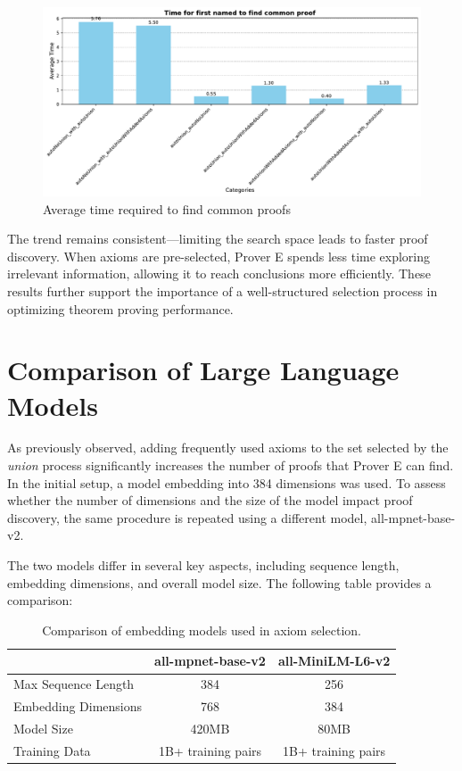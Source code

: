 \documentclass[english,version-2020-11]{uzl-thesis}
\begin{document}
\begin{figure}[h!]
    \centering
    \includegraphics[width=\textwidth]{time_to_find_common_proof.pdf}
    \caption{Average time required to find common proofs}
    \label{fig:time_different_mode}
\end{figure}        
\FloatBarrier

The trend remains consistent—limiting the search space leads to faster proof discovery. When axioms are pre-selected, Prover E spends less time exploring irrelevant information, allowing it to reach conclusions more efficiently. These results further support the importance of a well-structured selection process in optimizing theorem proving performance.


\section{Comparison of Large Language Models}

As previously observed, adding frequently used axioms to the set selected by the \textit{union} process significantly increases the number of proofs that Prover E can find. In the initial setup, a model embedding into 384 dimensions was used. To assess whether the number of dimensions and the size of the model impact proof discovery, the same procedure is repeated using a different model, all-mpnet-base-v2.

The two models differ in several key aspects, including sequence length, embedding dimensions, and overall model size. The following table provides a comparison:

\begin{table}[h]
    \centering
    \begin{tabular}{lcc}
        \hline
        & \textbf{all-mpnet-base-v2} & \textbf{all-MiniLM-L6-v2} \\
        \hline
        Max Sequence Length & 384 & 256 \\
        Embedding Dimensions & 768 & 384 \\
        Model Size & 420MB & 80MB \\
        Training Data & 1B+ training pairs & 1B+ training pairs \\
        \hline
    \end{tabular}
    \caption{Comparison of embedding models used in axiom selection.}
    \label{tab:model_comparison}
\end{table}
\end{document}
